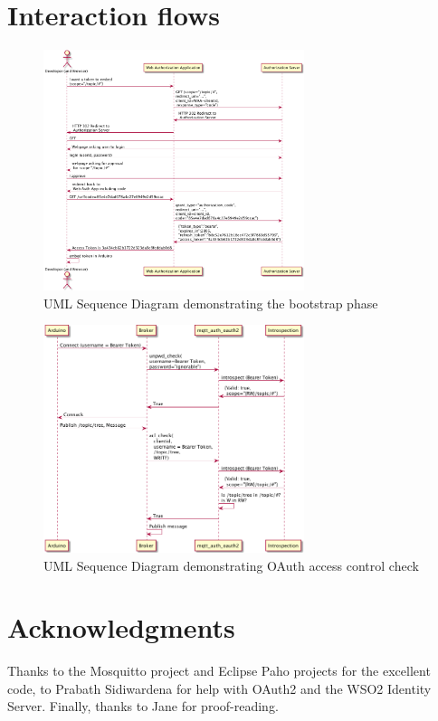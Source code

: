 \documentclass{llncs}
\begin{document}
\section{Interaction flows}\label{app:int}
\begin{figure}[!t]
\centering
\includegraphics[width=3in]{bootstrap-sequence.png}
\caption{UML Sequence Diagram demonstrating the bootstrap phase}
\label{fig:bootstrap-sequence-diagram}
\end{figure}
\FloatBarrier
\begin{figure}[!t]
\centering
\includegraphics[width=3in]{runtime-sequence.png}
\caption{UML Sequence Diagram demonstrating OAuth access control check}
\label{fig:runtime-sequence-diagram}
\end{figure}
\FloatBarrier
\section*{Acknowledgments}
Thanks to the Mosquitto project and Eclipse Paho projects for the excellent code, to Prabath Sidiwardena for help with OAuth2 and the WSO2 Identity Server. Finally, thanks to Jane for proof-reading.




\end{document}
